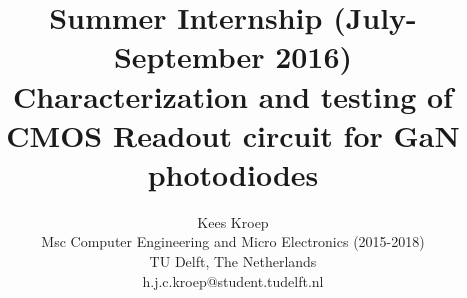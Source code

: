 \documentclass{article}
\title{Summer Internship (July-September 2016)\\Characterization and testing of CMOS Readout circuit for GaN photodiodes}
\author{Kees Kroep\\ Msc Computer Engineering and Micro Electronics (2015-2018)\\TU Delft, The Netherlands\\h.j.c.kroep@student.tudelft.nl }
\begin{document}
  \maketitle

\listoftodos
\clearpage
\tableofcontents

\clearpage

\clearpage




\clearpage

\clearpage

\clearpage



\clearpage





\appendix
%
%
%
\end{document}
